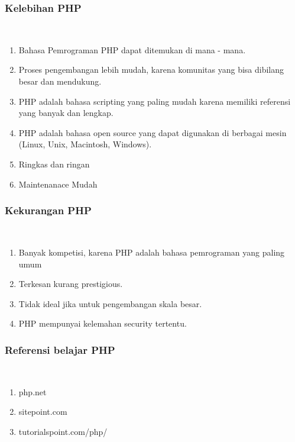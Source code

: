 \subsubsection{Kelebihan PHP}
\hfill\\
\begin{enumerate}
	\item Bahasa Pemrograman PHP dapat ditemukan di mana - mana.
	\item Proses pengembangan lebih mudah, karena komunitas yang bisa dibilang besar dan mendukung.
	\item PHP adalah bahasa scripting yang paling mudah karena memiliki referensi yang banyak dan lengkap.
	\item PHP adalah bahasa open source yang dapat digunakan di berbagai mesin (Linux, Unix, Macintosh, Windows).
	\item Ringkas dan ringan
	\item Maintenanace Mudah
\end{enumerate}

\subsubsection{Kekurangan PHP}
\hfill\\
\begin{enumerate}
	\item Banyak kompetisi, karena PHP adalah bahasa pemrograman yang paling umum
	\item Terkesan kurang prestigious.
	\item Tidak ideal jika untuk pengembangan skala besar.
	\item PHP mempunyai kelemahan security tertentu.
\end{enumerate}

\subsubsection{Referensi belajar PHP}
\hfill\\
\begin{enumerate}
	\item php.net
	\item sitepoint.com
	\item tutorialspoint.com/php/
\end{enumerate}
	
